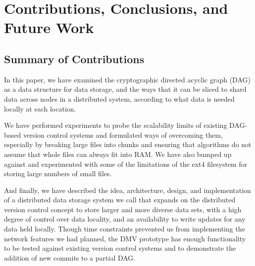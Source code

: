 \chapter{Contributions, Conclusions, and Future Work}

\section{Summary of Contributions}

In this paper, we have examined the cryptographic directed acyclic graph (DAG)
as a data structure for data storage, and the ways that it can be sliced to
shard data across nodes in a distributed system, according to what data is
needed locally at each location.

We have performed experiments to probe the scalability limits of existing
DAG-based version control systems and formulated ways of overcoming them,
especially by breaking large files into chunks and ensuring that algorithms do
not assume that whole files can always fit into RAM. We have also bumped up
against and experimented with some of the limitations of the ext4 filesystem for
storing large numbers of small files.

And finally, we have described the idea, architecture, design, and
implementation of a distributed data storage system we call  that expands on the distributed version control concept
to store larger and more diverse data sets, with a high degree of control over
data locality, and an availability to write updates for any data held locally.
Though time constraints prevented us from implementing the network features we
had planned, the DMV prototype has enough functionality to be tested against
existing version control systems and to demonstrate the addition of new commits
to a partial DAG.

